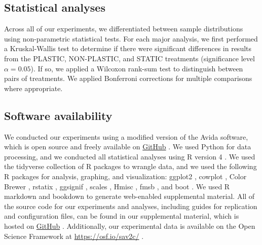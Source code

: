 \subsection{Statistical analyses}

Across all of our experiments, we differentiated between sample distributions using non-parametric statistical tests.
For each major analysis, we first performed a Kruskal-Wallis test \citep{kruskal_use_1952} to 
determine if there were significant differences in results from the PLASTIC, NON-PLASTIC, and STATIC treatments (significance level $\alpha=0.05$).
If so, we applied a Wilcoxon rank-sum test \citep{kotz_individual_1992} to distinguish between pairs of treatments.
We applied Bonferroni corrections for multiple comparisons \citep{rice_analyzing_1989} where appropriate.

\subsection{Software availability}

We conducted our experiments using a modified version of the Avida software, which is open source and freely available on \href{https://github.com/amlalejini/evolutionary-consequences-of-plasticity}{GitHub} \citep{supplemental_material}.
We used Python for data processing, and we conducted all statistical analyses using R version 4 \citep{r_core_team_r_v4}.
We used the tidyverse collection of R packages \citep{r_tidyverse_2019} to wrangle data, and we used the following R packages for analysis, graphing, and visualization: 
ggplot2 \citep{R-ggplot2}, 
cowplot \citep{R-cowplot}, 
Color Brewer \citep{harrower_colorbrewerorg_2003,R-Brewer_2014}, 
rstatix \citep{R-rstatix},
ggsignif \citep{R-ggsignif},
scales \citep{R-scales},
Hmisc \citep{R-Hmisc}, 
fmsb \citep{R-fmsb}, 
and boot \citep{R-boot}.
We used R markdown \citep{rmarkdown} and bookdown \citep{R-bookdown} to generate web-enabled supplemental material.
All of the source code for our experiments and analyses, including guides for replication and configuration files, can be found in our supplemental material, which is hosted on \href{https://github.com/amlalejini/evolutionary-consequences-of-plasticity}{GitHub} \citep{supplemental_material}.
Additionally, our experimental data is available on the Open Science Framework at \url{https://osf.io/sav2c/} \citep{osf_data}.